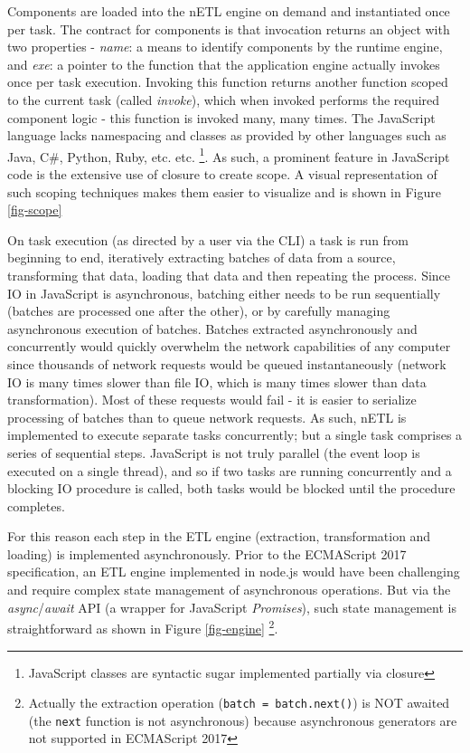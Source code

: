 Components are loaded into the nETL engine on demand and instantiated once per task. The contract for components is that invocation returns an object with two properties - \textit{name}: a means to identify components by the runtime engine, and \textit{exe}: a pointer to the function that the application engine actually invokes once per task execution. Invoking this function returns another function scoped to the current task (called \textit{invoke}), which when invoked performs the required component logic - this function is invoked many, many times. The JavaScript language lacks namespacing and classes as provided by other languages such as Java, C\#, Python, Ruby, etc. etc. \footnote{JavaScript classes are syntactic sugar implemented partially via closure}. As such, a prominent feature in JavaScript code is the extensive use of closure to create scope. A visual representation of such scoping techniques makes them easier to visualize and is shown in Figure \ref{fig-scope}



On task execution (as directed by a user via the CLI) a task is run from beginning to end, iteratively extracting batches of data from a source, transforming that data, loading that data and then repeating the process. Since IO in JavaScript is asynchronous, batching either needs to be run sequentially (batches are processed one after the other), or by carefully managing asynchronous execution of batches. Batches extracted asynchronously and concurrently would quickly overwhelm the network capabilities of any computer since thousands of network requests would be queued instantaneously (network IO is many times slower than file IO, which is many times slower than data transformation). Most of these requests would fail - it is easier to serialize processing of batches than to queue network requests. As such, nETL is implemented to execute separate tasks concurrently; but a single task comprises a series of sequential steps. JavaScript is not truly parallel (the event loop is executed on a single thread), and so if two tasks are running concurrently and a blocking IO procedure is called, both tasks would be blocked until the procedure completes.

For this reason each step in the ETL engine (extraction, transformation and loading) is implemented asynchronously. Prior to the ECMAScript 2017 specification, an ETL engine implemented in node.js would have been challenging and require complex state management of asynchronous operations. But via the \textit{async}/\textit{await} API (a wrapper for JavaScript \textit{Promises}), such state management is straightforward as shown in Figure \ref{fig-engine} \footnote{Actually the extraction operation (\texttt{batch = batch.next()}) is NOT awaited (the \texttt{next} function is not asynchronous) because asynchronous generators are not supported in ECMAScript 2017}.

